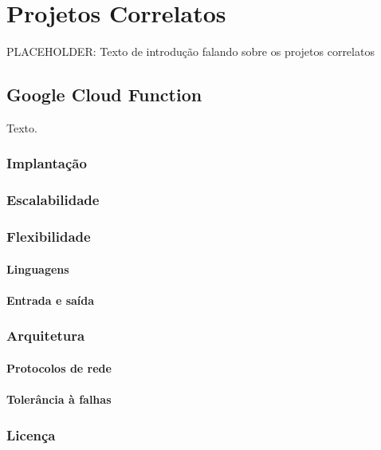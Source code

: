 \chapter{Projetos Correlatos}

PLACEHOLDER: Texto de introdução falando sobre os projetos correlatos

\section{Google Cloud Function}

Texto.

\subsection{Implantação}

\subsection{Escalabilidade}

\subsection{Flexibilidade}

\subsubsection{Linguagens}
\subsubsection{Entrada e saída}

\subsection{Arquitetura}

\subsubsection{Protocolos de rede}

\subsubsection{Tolerância à falhas}

\subsection{Licença}

